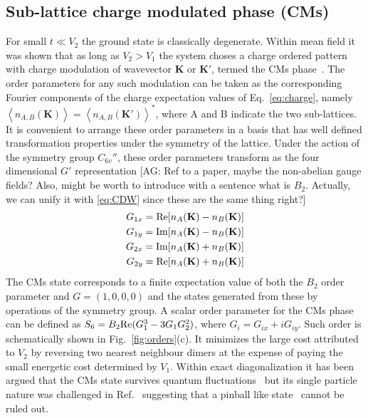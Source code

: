 \documentclass[aps,prx,10pt,twocolumn,floatfix,superscriptaddress,showpacs,numerical,footinbib]{revtex4-1}
\newcommand{\noteAG}[1]{{\color{blue} [AG: #1]}}
\begin{document}
\subsection{Sub-lattice charge modulated phase (CMs)}
%
For small $t \ll V_{2}$ the ground state is classically degenerate. 
%
Within mean field it was shown that as long as $V_{2}>V_{1}$ the system choses a charge ordered pattern with charge modulation 
of wavevector $\mathbf{K}$ or $\mathbf{K}'$, termed the CMs phase~\cite{GCC13}. 
%
The order parameters for any such modulation can be taken as the corresponding Fourier components of the charge expectation values of Eq.~\eqref{eq:charge},
namely $\left\langle n_{A,B}(\mathbf{K}) \right\rangle = \left\langle n_{A,B}(\mathbf{K}') \right\rangle^*$, where A and B indicate the two sub-lattices.
%
It is convenient to arrange these order parameters in a basis that has well defined transformation properties under the symmetry of the lattice.
%
Under the action of the symmetry group $C_{6v}''$, these order parameters transform as the four dimensional $G'$ representation 
\noteAG{Ref to a paper, maybe the non-abelian gauge fields? Also, might be worth to introduce with a sentence what is $B_2$.
Actually, we can unify it with \eqref{eq:CDW} since these are the same thing right?}
%
\begin{align}
G_{1x} = {\rm Re}[n_{A}(\mathbf{K}) -n_{B}(\mathbf{K})] \\
G_{1y} =  {\rm Im}[n_{A}(\mathbf{K}) -n_{B}(\mathbf{K})] \\
G_{2x} =  {\rm Im}[n_{A}(\mathbf{K}) +n_{B}(\mathbf{K})] \\
G_{2y} =  {\rm Re}[n_{A}(\mathbf{K}) +n_{B}(\mathbf{K})]
\end{align}
%
The CMs state corresponds to a finite expectation value of both the $B_2$ order parameter and $G = (1,0,0,0)$ and the states generated from these by operations of the symmetry group. A scalar order parameter for the CMs phase can be defined as $S_6 = B_2 {\rm Re}(G_1^3-3G_1G_2^2)$, where $G_i = G_{ix}+iG_{iy}$. 
%
Such order is schematically shown in Fig.~\ref{fig:orders}(c). It minimizes the large cost
attributed to $V_{2}$ by reversing two nearest neighbour dimers at the expense of paying the small energetic cost determined by $V_{1}$.
%
Within exact diagonalization it has been argued that the CMs state survives quantum fluctuations~\cite{GGNVC13,DH14,DCH14} 
but its single particle nature was challenged in Ref.~ suggesting that a pinball like state~\cite{HF06,MRF13} cannot be ruled out.\\
\end{document}
